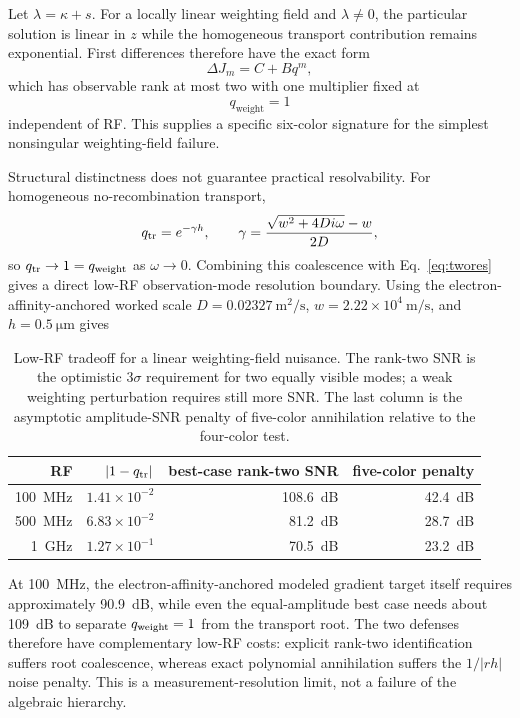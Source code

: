\documentclass[11pt]{article}
\begin{document}
Let $\lambda=\kappa+s$. For a locally linear weighting field and $\lambda\neq0$, the particular solution is linear in $z$ while the homogeneous transport contribution remains exponential. First differences therefore have the exact form
\begin{equation}
\boxed{\Delta J_m=C+Bq^m,}
\label{eq:weighting_rank2}
\end{equation}
which has observable rank at most two with one multiplier fixed at
\begin{equation}
\boxed{q_{\mathrm{weight}}=1}
\end{equation}
independent of RF. This supplies a specific six-color signature for the simplest nonsingular weighting-field failure.

Structural distinctness does not guarantee practical resolvability. For homogeneous no-recombination transport,
\begin{equation}
q_{\rm tr}=e^{-\gamma h},\qquad
\gamma=\frac{\sqrt{w^2+4Di\omega}-w}{2D},
\end{equation}
so $q_{\rm tr}\to1=q_{\rm weight}$ as $\omega\to0$. Combining this coalescence with Eq.~\eqref{eq:twores} gives a direct low-RF observation-mode resolution boundary. Using the electron-affinity-anchored worked scale $D=0.02327~\mathrm{m^2/s}$, $w=2.22\times10^4~\mathrm{m/s}$, and $h=0.5~\si{\micro\meter}$ gives
\begin{table}[H]
\centering
\caption{Low-RF tradeoff for a linear weighting-field nuisance. The rank-two SNR is the optimistic $3\sigma$ requirement for two equally visible modes; a weak weighting perturbation requires still more SNR. The last column is the asymptotic amplitude-SNR penalty of five-color annihilation relative to the four-color test.}
\label{tab:weighting_coalescence}
\begin{tabular}{rrrr}
\toprule
RF & $|1-q_{\rm tr}|$ & best-case rank-two SNR & five-color penalty \\
\midrule
\SI{100}{MHz} & $1.41\times10^{-2}$ & \SI{108.6}{dB} & \SI{42.4}{dB} \\
\SI{500}{MHz} & $6.83\times10^{-2}$ & \SI{81.2}{dB} & \SI{28.7}{dB} \\
\SI{1}{GHz} & $1.27\times10^{-1}$ & \SI{70.5}{dB} & \SI{23.2}{dB} \\
\bottomrule
\end{tabular}
\end{table}
At \SI{100}{MHz}, the electron-affinity-anchored modeled gradient target itself requires approximately \SI{90.9}{dB}, while even the equal-amplitude best case needs about \SI{109}{dB} to separate $q_{\rm weight}=1$ from the transport root. The two defenses therefore have complementary low-RF costs: explicit rank-two identification suffers root coalescence, whereas exact polynomial annihilation suffers the $1/|rh|$ noise penalty. This is a measurement-resolution limit, not a failure of the algebraic hierarchy.
\end{document}
